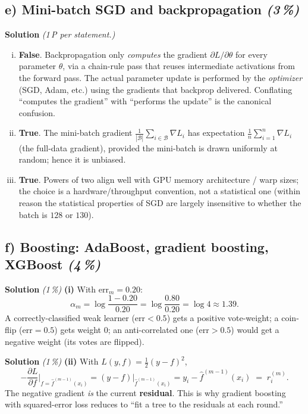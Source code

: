 \documentclass[11pt,a4paper]{article}
\newcommand{\subpoints}[1]{\textit{(#1\,\%)}}
\newcommand{\sol}{\noindent\textbf{Solution}}
\begin{document}
\subsection*{e) Mini-batch SGD and backpropagation \subpoints{3}}
\sol{} \emph{(1\,P per statement.)}
\begin{enumerate}[(i)]
  \item \textbf{False}. Backpropagation only \emph{computes} the gradient
        $\partial L/\partial \theta$ for every parameter $\theta$, via a chain-rule pass that
        reuses intermediate activations from the forward pass. The actual parameter update is
        performed by the \emph{optimizer} (SGD, Adam, etc.) using the gradients that backprop
        delivered. Conflating ``computes the gradient'' with ``performs the update'' is the
        canonical confusion.
  \item \textbf{True}. The mini-batch gradient $\tfrac{1}{|\mathcal B|}\sum_{i\in\mathcal B}\nabla L_i$
        has expectation $\tfrac{1}{n}\sum_{i=1}^n \nabla L_i$ (the full-data gradient), provided
        the mini-batch is drawn uniformly at random; hence it is unbiased.
  \item \textbf{True}. Powers of two align well with GPU memory architecture / warp sizes; the
        choice is a hardware/throughput convention, not a statistical one (within reason the
        statistical properties of SGD are largely insensitive to whether the batch is $128$ or
        $130$).
\end{enumerate}

\subsection*{f) Boosting: AdaBoost, gradient boosting, XGBoost \subpoints{4}}

\sol{} \subpoints{1} \textbf{(i)} With $\mathrm{err}_m = 0.20$:
$$\alpha_m = \log\frac{1-0.20}{0.20} = \log\frac{0.80}{0.20} = \log 4 \approx \boxed{1.39}.$$
A correctly-classified weak learner ($\mathrm{err}<0.5$) gets a positive vote-weight; a coin-flip
($\mathrm{err}=0.5$) gets weight $0$; an anti-correlated one ($\mathrm{err}>0.5$) would get a
negative weight (its votes are flipped).

\medskip
\sol{} \subpoints{1} \textbf{(ii)} With $L(y,f) = \tfrac{1}{2}(y-f)^2$,
$$-\frac{\partial L}{\partial f}\bigg|_{f=\hat f^{(m-1)}(x_i)} = (y - f)\big|_{\hat f^{(m-1)}(x_i)} = y_i - \hat f^{(m-1)}(x_i) \;=\; r_i^{(m)}.$$
The negative gradient \emph{is} the current \textbf{residual}. This is why gradient boosting with
squared-error loss reduces to ``fit a tree to the residuals at each round.''
\end{document}
